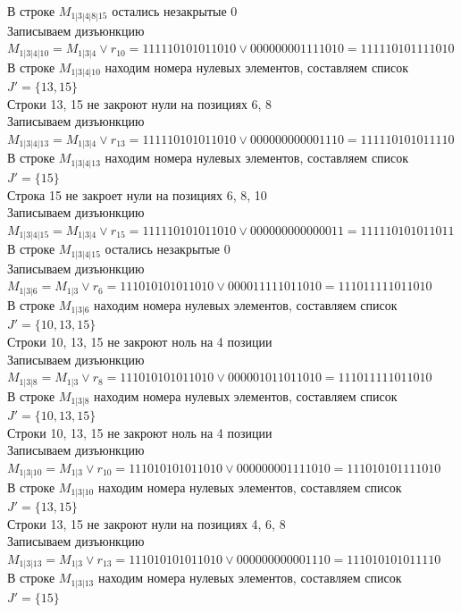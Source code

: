 \documentclass[12pt,a4paper]{report}
\begin{document}
В строке $M_{1 | 3 | 4 | 8 | 15}$ остались незакрытые $0$ \\
Записываем дизъюнкцию $M_{1 | 3 | 4 | 10} = M_{1 | 3 | 4}\vee r_{10} = 111110101011010 \vee 000000001111010 = 111110101111010$ \\
В строке $M_{1 | 3 | 4 | 10}$ находим номера нулевых элементов, составляем список $J' = \{13, 15\}$ \\
Строки 13, 15 не закроют нули на позициях 6, 8 \\
Записываем дизъюнкцию $M_{1 | 3 | 4 | 13} = M_{1 | 3 | 4}\vee r_{13} = 111110101011010 \vee 000000000001110 = 111110101011110$ \\
В строке $M_{1 | 3 | 4 | 13}$ находим номера нулевых элементов, составляем список $J' = \{15\}$ \\
Строка 15 не закроет нули на позициях 6, 8, 10 \\
Записываем дизъюнкцию $M_{1 | 3 | 4 | 15} = M_{1 | 3 | 4}\vee r_{15} = 111110101011010 \vee 000000000000011 = 111110101011011$ \\
В строке $M_{1 | 3 | 4 | 15}$ остались незакрытые $0$ \\
Записываем дизъюнкцию $M_{1 | 3 | 6} = M_{1 | 3}\vee r_{6} = 111010101011010 \vee 000011111011010 = 111011111011010$ \\
В строке $M_{1 | 3 | 6}$ находим номера нулевых элементов, составляем список $J' = \{10, 13, 15\}$ \\
Строки 10, 13, 15 не закроют ноль на 4 позиции \\
Записываем дизъюнкцию $M_{1 | 3 | 8} = M_{1 | 3}\vee r_{8} = 111010101011010 \vee 000001011011010 = 111011111011010$ \\
В строке $M_{1 | 3 | 8}$ находим номера нулевых элементов, составляем список $J' = \{10, 13, 15\}$ \\
Строки 10, 13, 15 не закроют ноль на 4 позиции \\
Записываем дизъюнкцию $M_{1 | 3 | 10} = M_{1 | 3}\vee r_{10} = 111010101011010 \vee 000000001111010 = 111010101111010$ \\
В строке $M_{1 | 3 | 10}$ находим номера нулевых элементов, составляем список $J' = \{13, 15\}$ \\
Строки 13, 15 не закроют нули на позициях 4, 6, 8 \\
Записываем дизъюнкцию $M_{1 | 3 | 13} = M_{1 | 3}\vee r_{13} = 111010101011010 \vee 000000000001110 = 111010101011110$ \\
В строке $M_{1 | 3 | 13}$ находим номера нулевых элементов, составляем список $J' = \{15\}$ \\
\end{document}

